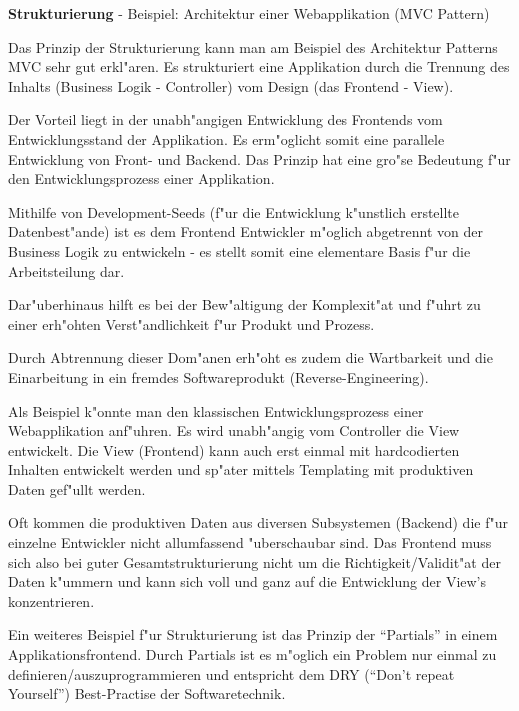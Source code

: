 \newpage

\textbf{Strukturierung}
- Beispiel: Architektur einer Webapplikation (MVC Pattern)

Das Prinzip der Strukturierung kann man am Beispiel des Architektur Patterns MVC sehr gut erkl"aren.
Es strukturiert eine Applikation durch die Trennung des Inhalts (Business Logik - Controller) vom Design (das Frontend - View).

Der Vorteil liegt in der unabh"angigen Entwicklung des Frontends vom Entwicklungsstand der Applikation. Es erm"oglicht somit eine parallele Entwicklung von Front- und Backend. Das Prinzip hat eine gro"se Bedeutung f"ur den Entwicklungsprozess einer Applikation.

Mithilfe von Development-Seeds (f"ur die Entwicklung k"unstlich erstellte Datenbest"ande) ist es dem Frontend Entwickler m"oglich abgetrennt von der Business Logik zu entwickeln - es stellt somit eine elementare Basis f"ur die Arbeitsteilung dar.

Dar"uberhinaus hilft es bei der Bew"altigung der Komplexit"at und f"uhrt zu einer erh"ohten Verst"andlichkeit f"ur Produkt und Prozess.

Durch Abtrennung dieser Dom"anen erh"oht es zudem die Wartbarkeit und die Einarbeitung in ein fremdes Softwareprodukt (Reverse-Engineering).

Als Beispiel k"onnte man den klassischen Entwicklungsprozess einer Webapplikation anf"uhren. Es wird unabh"angig vom Controller die View entwickelt.
Die View (Frontend) kann auch erst einmal mit hardcodierten Inhalten entwickelt werden und sp"ater mittels Templating mit produktiven Daten gef"ullt werden.

Oft kommen die produktiven Daten aus diversen Subsystemen (Backend) die f"ur einzelne Entwickler nicht allumfassend "uberschaubar sind.
Das Frontend muss sich also bei guter Gesamtstrukturierung nicht um die Richtigkeit/Validit"at der Daten k"ummern und kann sich voll und ganz auf die Entwicklung der View's konzentrieren.

Ein weiteres Beispiel f"ur Strukturierung ist das Prinzip der ``Partials'' in einem Applikationsfrontend. Durch Partials ist es m"oglich ein Problem nur einmal zu definieren/auszuprogrammieren und entspricht dem DRY (``Don't repeat Yourself'') Best-Practise der Softwaretechnik.

